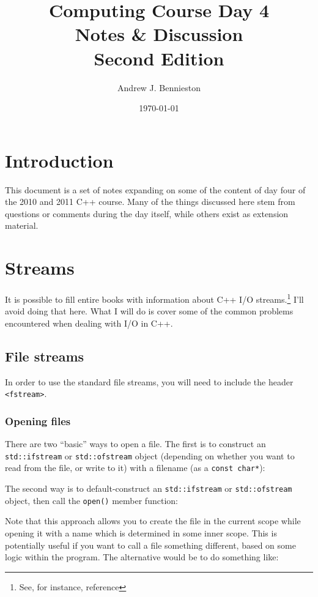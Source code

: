 \documentclass[a4paper]{scrartcl}
\title{Computing Course Day 4\\
Notes \& Discussion\\
Second Edition}
\author{Andrew J. Bennieston}
\date{\today}
\begin{document}
\maketitle

\tableofcontents

\pagebreak

\section{Introduction}\label{sec:introduction}
This document is a set of notes expanding on some of the content of day four of the 2010 and 2011 C++ course. Many of the things discussed here stem from questions or comments during the day itself, while others exist as extension material.

\section{Streams}\label{sec:streams}
It is possible to fill entire books with information about C++ I/O streams.\footnote{See, for instance, reference\cite{IOStreams}} I'll avoid doing that here. What I will do is cover some of the common problems encountered when dealing with I/O in C++.

\subsection{File streams}
In order to use the standard file streams, you will need to include the header \verb|<fstream>|.

\subsubsection{Opening files}
There are two ``basic'' ways to open a file. The first is to construct an \verb|std::ifstream| or \verb|std::ofstream| object (depending on whether you want to read from the file, or write to it) with a filename (as a \verb|const char*|):


The second way is to default-construct an \verb|std::ifstream| or \verb|std::ofstream| object, then call the \verb|open()| member function:


Note that this approach allows you to create the file in the current scope while opening it with a name which is determined in some inner scope. This is potentially useful if you want to call a file something different, based on some logic within the program. The alternative would be to do something like:

\end{document}
